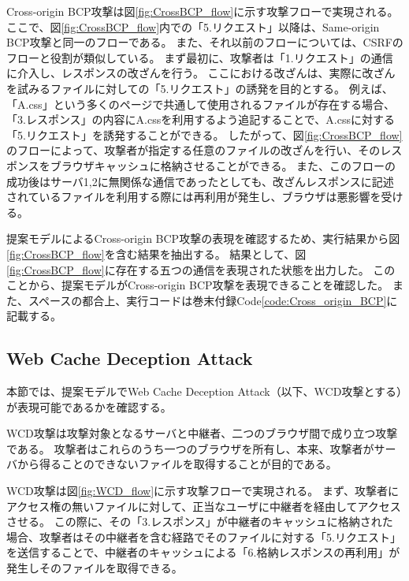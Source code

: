 \documentclass[journal]{IEEEtran}
\begin{document}
Cross-origin BCP攻撃は図\ref{fig:CrossBCP_flow}に示す攻撃フローで実現される。
ここで、図\ref{fig:CrossBCP_flow}内での「5.リクエスト」以降は、Same-origin BCP攻撃と同一のフローである。
また、それ以前のフローについては、CSRFのフローと役割が類似している。
まず最初に、攻撃者は「1.リクエスト」の通信に介入し、レスポンスの改ざんを行う。
ここにおける改ざんは、実際に改ざんを試みるファイルに対しての「5.リクエスト」の誘発を目的とする。
例えば、「A.css」という多くのページで共通して使用されるファイルが存在する場合、「3.レスポンス」の内容にA.cssを利用するよう追記することで、A.cssに対する「5.リクエスト」を誘発することができる。
したがって、図\ref{fig:CrossBCP_flow}のフローによって、攻撃者が指定する任意のファイルの改ざんを行い、そのレスポンスをブラウザキャッシュに格納させることができる。
また、このフローの成功後はサーバ1,2に無関係な通信であったとしても、改ざんレスポンスに記述されているファイルを利用する際には再利用が発生し、ブラウザは悪影響を受ける。


提案モデルによるCross-origin BCP攻撃の表現を確認するため、実行結果から図\ref{fig:CrossBCP_flow}を含む結果を抽出する。
結果として、図\ref{fig:CrossBCP_flow}に存在する五つの通信を表現された状態を出力した。
このことから、提案モデルがCross-origin BCP攻撃を表現できることを確認した。
また、スペースの都合上、実行コードは巻末付録Code\ref{code:Cross_origin_BCP}に記載する。

\subsection{Web Cache Deception Attack}
本節では、提案モデルでWeb Cache Deception Attack\cite{WCD}（以下、WCD攻撃とする）が表現可能であるかを確認する。

WCD攻撃は攻撃対象となるサーバと中継者、二つのブラウザ間で成り立つ攻撃である。
攻撃者はこれらのうち一つのブラウザを所有し、本来、攻撃者がサーバから得ることのできないファイルを取得することが目的である。

WCD攻撃は図\ref{fig:WCD_flow}に示す攻撃フローで実現される。
まず、攻撃者にアクセス権の無いファイルに対して、正当なユーザに中継者を経由してアクセスさせる。
この際に、その「3.レスポンス」が中継者のキャッシュに格納された場合、攻撃者はその中継者を含む経路でそのファイルに対する「5.リクエスト」を送信することで、中継者のキャッシュによる「6.格納レスポンスの再利用」が発生しそのファイルを取得できる。
\end{document}
